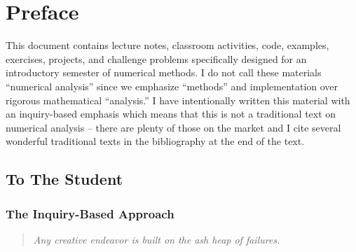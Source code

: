 \setcounter{chapter}{-1}
\chapter{Preface}
This document contains lecture notes, classroom activities, code, examples, exercises,
projects, and challenge
problems specifically designed for an introductory semester of numerical methods.  I do not call these materials ``numerical analysis'' since we emphasize
``methods'' and implementation over rigorous mathematical ``analysis.''  I have
intentionally written this material with an inquiry-based emphasis which means that this
is not a traditional text on numerical analysis -- there are plenty of those on the market
and I cite several wonderful traditional texts in the bibliography at the end of the text.

\section{To The Student}

\subsection{The Inquiry-Based Approach}
\begin{quote}
    {\it Any creative endeavor is built on the ash heap of failures.}
\end{quote}

